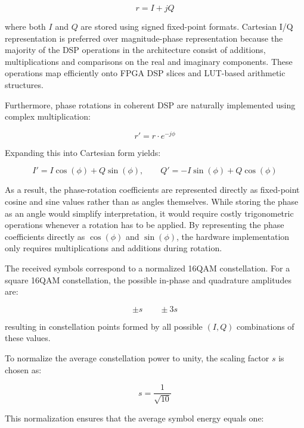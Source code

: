\begin{equation}
r = I + jQ
\end{equation}

where both $I$ and $Q$ are stored using signed fixed-point formats. Cartesian \ac{I/Q} representation is preferred
over magnitude-phase representation because the majority of the DSP operations in the architecture consist of additions,
multiplications and comparisons on the real and imaginary components. These operations map efficiently onto FPGA DSP slices
and LUT-based arithmetic structures.

Furthermore, phase rotations in coherent DSP are naturally implemented using complex multiplication:

\begin{equation}
r' = r \cdot e^{-j\phi}
\end{equation}

Expanding this into Cartesian form yields:

\begin{equation}\label{eq:cartesian-rotation}
I' = I\cos(\phi) + Q\sin(\phi), \qquad
Q' = -I\sin(\phi) + Q\cos(\phi)
\end{equation}

As a result, the phase-rotation coefficients are represented directly as fixed-point cosine and sine values rather than as
angles themselves. While storing the phase as an angle would simplify interpretation, it would require costly trigonometric
operations whenever a rotation has to be applied. By representing the phase coefficients directly as
$\cos(\phi)$ and $\sin(\phi)$, the hardware implementation only requires multiplications and additions during rotation.

The received symbols correspond to a normalized 16QAM constellation. For a square 16QAM constellation, the possible in-phase
and quadrature amplitudes are:

\begin{equation}
\pm s \qquad \pm 3s
\end{equation}

resulting in constellation points formed by all possible $(I,Q)$ combinations of these values.

To normalize the average constellation power to unity, the scaling factor $s$ is chosen as:

\begin{equation}
s = \frac{1}{\sqrt{10}}
\end{equation}

This normalization ensures that the average symbol energy equals one:

